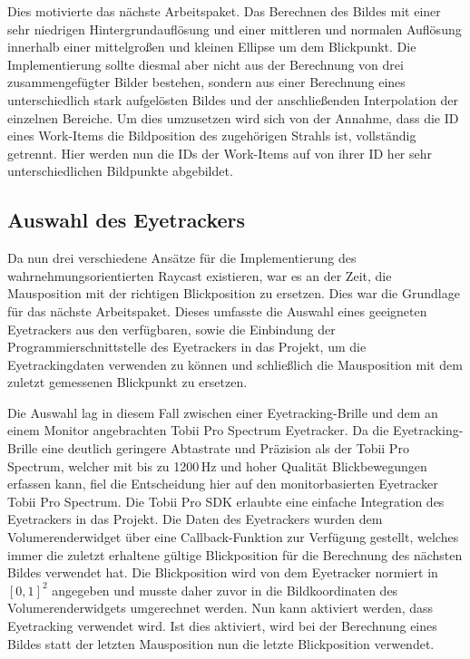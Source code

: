 Dies motivierte das nächste Arbeitspaket.
Das Berechnen des Bildes mit einer sehr niedrigen Hintergrundauflösung und einer mittleren und normalen Auflösung innerhalb einer mittelgroßen und kleinen Ellipse um dem Blickpunkt.
Die Implementierung sollte diesmal aber nicht aus der Berechnung von drei zusammengefügter Bilder bestehen, sondern aus einer Berechnung eines unterschiedlich stark aufgelösten Bildes und der anschließenden Interpolation der einzelnen Bereiche.
Um dies umzusetzen wird sich von der Annahme, dass die ID eines Work-Items die Bildposition des zugehörigen Strahls ist, vollständig getrennt.
Hier werden nun die IDs der Work-Items auf von ihrer ID her sehr unterschiedlichen Bildpunkte abgebildet.


\subsection{Auswahl des Eyetrackers}
Da nun drei verschiedene Ansätze für die Implementierung des wahrnehmungsorientierten Raycast existieren, war es an der Zeit, die Mausposition mit der richtigen Blickposition zu ersetzen.
Dies war die Grundlage für das nächste Arbeitspaket.
Dieses umfasste die Auswahl eines geeigneten Eyetrackers aus den verfügbaren, sowie die Einbindung der Programmierschnittstelle des Eyetrackers in das Projekt, um die Eyetrackingdaten verwenden zu können und schließlich die Mausposition mit dem zuletzt gemessenen Blickpunkt zu ersetzen.

Die Auswahl lag in diesem Fall zwischen einer Eyetracking-Brille und dem an einem Monitor angebrachten Tobii Pro Spectrum Eyetracker.
Da die Eyetracking-Brille eine deutlich geringere Abtastrate und Präzision als der Tobii Pro Spectrum, welcher mit bis zu 1200\,Hz und hoher Qualität Blickbewegungen erfassen kann, fiel die Entscheidung hier auf den monitorbasierten Eyetracker Tobii Pro Spectrum.
Die Tobii Pro SDK erlaubte eine einfache Integration des Eyetrackers in das Projekt.
Die Daten des Eyetrackers wurden dem Volumerenderwidget über eine Callback-Funktion zur Verfügung gestellt, welches immer die zuletzt erhaltene gültige Blickposition für die Berechnung des nächsten Bildes verwendet hat.
Die Blickposition wird von dem Eyetracker normiert in $[0,1]^2$ angegeben und musste daher zuvor in die Bildkoordinaten des Volumerenderwidgets umgerechnet werden.
Nun kann aktiviert werden, dass Eyetracking verwendet wird.
Ist dies aktiviert, wird bei der Berechnung eines Bildes statt der letzten Mausposition nun die letzte Blickposition verwendet.

